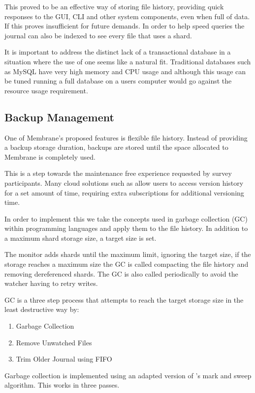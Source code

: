 \documentclass[11pt, a4paper, twocolumn, twoside]{report}
\begin{document}
This proved to be an effective way of storing file history, providing quick responses to the GUI, CLI and other system components, even when full of data. If this proves insufficient for future demands. In order to help speed queries the journal can also be indexed to see every file that uses a shard.

It is important to address the distinct lack of a transactional database in a situation where the use of one seems like a natural fit. Traditional databases such as MySQL have very high memory and CPU usage \citep{james2017sql} and although this usage can be tuned running a full database on a users computer would go against the resource usage requirement.

\subsection{Backup Management}

One of Membrane's proposed features is flexible file history. Instead of providing a backup storage duration, backups are stored until the space allocated to Membrane is completely used.

This is a step towards the maintenance free experience requested by survey participants. Many cloud solutions such as \cite{dropbox2017versions} allow users to access version history for a set amount of time, requiring extra subscriptions for additional versioning time.

In order to implement this we take the concepts used in garbage collection (GC) within programming languages and apply them to the file history. In addition to a maximum shard storage size, a target size is set.

The monitor adds shards until the maximum limit, ignoring the target size, if the storage reaches a maximum size the GC is called compacting the file history and removing dereferenced shards. The GC is also called periodically to avoid the watcher having to retry writes.

GC is a three step process that attempts to reach the target storage size in the least destructive way by:

\begin{enumerate}
 \item Garbage Collection
 \item Remove Unwatched Files
 \item Trim Older Journal using FIFO
\end{enumerate}

Garbage collection is implemented using an adapted version of \cite{dijkstra1978fly}'s mark and sweep algorithm. This works in three passes. 
\end{document}
